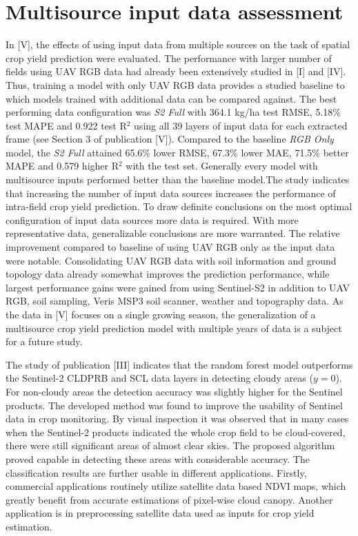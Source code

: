 \section{Multisource input data assessment}

In [V], the effects of using input data from multiple sources on the task of spatial crop yield prediction were evaluated. The performance with larger number of fields using UAV RGB data had already been extensively studied in [I] and [IV]. Thus, training a model with only UAV RGB data provides a studied baseline to which models trained with additional data can be compared against. The best performing data configuration was \emph{S2 Full} with 364.1 kg/ha test RMSE, 5.18\% test MAPE and 0.922 test R$^2$ using all 39 layers of input data for each extracted frame (see Section 3 of publication [V]). Compared to the baseline \emph{RGB Only} model, the \emph{S2 Full} attained 65.6\% lower RMSE, 67.3\% lower MAE, 71.5\% better MAPE and 0.579 higher R$^2$ with the test set. Generally every model with multisource inputs performed better than the baseline model.The study indicates that increasing the number of input data sources increases the performance of intra-field crop yield prediction. To draw definite conclusions on the most optimal configuration of input data sources more data is required. With more representative data, generalizable conclusions are more warranted. The relative improvement compared to baseline of using UAV RGB only as the input data were notable. Consolidating UAV RGB data with soil information and ground topology data already somewhat improves the prediction performance, while largest performance gains were gained from using Sentinel-S2 in addition to UAV RGB, soil sampling, Veris MSP3 soil scanner, weather and topography data. As the data in [V] focuses on a single growing season, the generalization of a multisource crop yield prediction model with multiple years of data is a subject for a future study.

The study of publication [III] indicates that the random forest model outperforms the Sentinel-2 CLDPRB and SCL data layers in detecting cloudy areas ($y = 0$). For non-cloudy areas the detection accuracy was slightly higher for the Sentinel products. The developed method was found to improve the usability of Sentinel data in crop monitoring. By visual inspection it was observed that in many cases when the Sentinel-2 products indicated the whole crop field to be cloud-covered, there were still significant areas of almost clear skies. The proposed algorithm proved capable in detecting these areas with considerable accuracy. The classification results are further usable in different applications. Firstly, commercial applications routinely utilize satellite data based NDVI maps, which greatly benefit from accurate estimations of pixel-wise cloud canopy. Another application is in preprocessing satellite data used as inputs for crop yield estimation.



